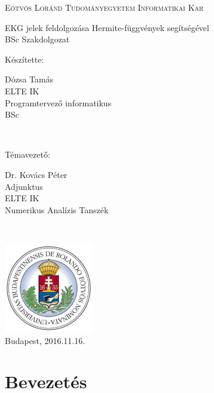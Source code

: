 \documentclass[oneside,titlepage,12pt,a4paper]{report}
\begin{document}
\begin{titlepage}
	\parbox[t]{5.5cm}{\vspace{1cm}}
\begin{center}
	\large
	\textsc{Eötvös Loránd Tudományegyetem \linebreak Informatikai Kar} \\[2cm]
\end{center}

\begin{center}
	\LARGE EKG jelek feldolgozása Hermite-függvények segítségével\\[0.55cm]
	\large BSc Szakdolgozat \\[1.9cm]
\end{center}

\begin{center}
	\parbox[t]{25mm}{Készítette:}
	\parbox[t]{5.5cm}
		{Dózsa Tamás\\
		ELTE IK\\
		Programtervező informatikus \\
		BSc
		}
	\\[0.9cm]
	
  \parbox[t]{25mm}{Témavezető:}
	\parbox[t]{5.5cm}{
		Dr. Kovács Péter\\
		Adjunktus\\
		ELTE IK\\
		Numerikus Analízis Tanszék
		}
	\\[4cm]
\end{center}

\begin{center}
	\includegraphics[scale=0.7]{./Abrak/Egyeb/elte_logo.jpg}\\[1cm]
	Budapest, 2016.11.16.
\end{center}
\end{titlepage}

\tableofcontents


\chapter{Bevezetés}
\label{intro}
\end{document}
